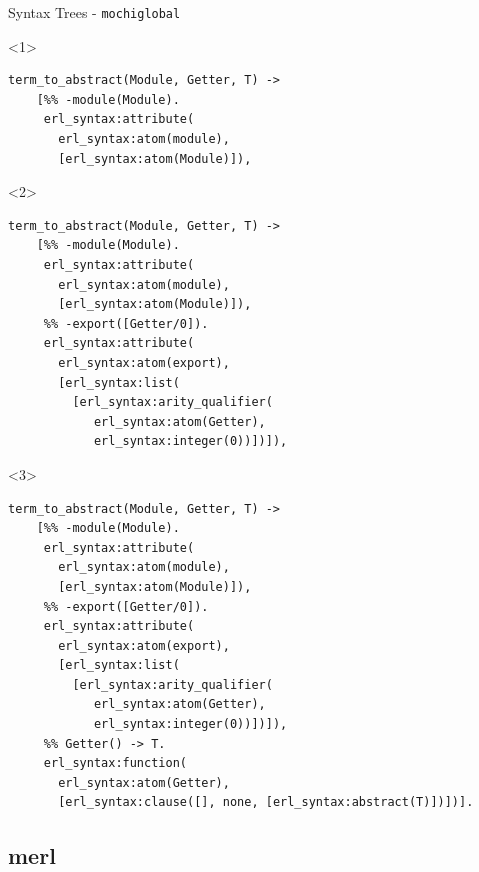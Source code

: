 \documentclass[c]{beamer}
\begin{document}
\begin{frame}[fragile,t]{Syntax Trees - \texttt{mochiglobal}}
  \begin{onlyenv}<1>
      \begin{lstlisting}
term_to_abstract(Module, Getter, T) ->
    [%% -module(Module).
     erl_syntax:attribute(
       erl_syntax:atom(module),
       [erl_syntax:atom(Module)]),
  \end{lstlisting}
  \end{onlyenv}

  \begin{onlyenv}<2>
      \begin{lstlisting}
term_to_abstract(Module, Getter, T) ->
    [%% -module(Module).
     erl_syntax:attribute(
       erl_syntax:atom(module),
       [erl_syntax:atom(Module)]),
     %% -export([Getter/0]).
     erl_syntax:attribute(
       erl_syntax:atom(export),
       [erl_syntax:list(
         [erl_syntax:arity_qualifier(
            erl_syntax:atom(Getter),
            erl_syntax:integer(0))])]),
  \end{lstlisting}
  \end{onlyenv}

  \begin{onlyenv}<3>
      \begin{lstlisting}
term_to_abstract(Module, Getter, T) ->
    [%% -module(Module).
     erl_syntax:attribute(
       erl_syntax:atom(module),
       [erl_syntax:atom(Module)]),
     %% -export([Getter/0]).
     erl_syntax:attribute(
       erl_syntax:atom(export),
       [erl_syntax:list(
         [erl_syntax:arity_qualifier(
            erl_syntax:atom(Getter),
            erl_syntax:integer(0))])]),
     %% Getter() -> T.
     erl_syntax:function(
       erl_syntax:atom(Getter),
       [erl_syntax:clause([], none, [erl_syntax:abstract(T)])])].
  \end{lstlisting}
  \end{onlyenv}
\end{frame}

\subsection{merl}
\end{document}

